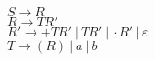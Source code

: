 \begin{center}
    $S \rightarrow R$  \\
    $R \rightarrow TR'$ \\
    $R' \rightarrow +TR' \ | \ TR' \ | \ \cdot R'\  | \ \varepsilon$ \\
    $T \rightarrow (R) \ | \ a \ | \  b$
\end{center}